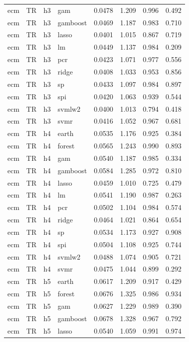 \begin{ThreePartTable}
\begin{longtable}[t]{llclcccc}
ecm & TR & h3 & gam & 0.0478 & 1.209 & 0.996 & 0.492\\
ecm & TR & h3 & gamboost & 0.0469 & 1.187 & 0.983 & 0.710\\
ecm & TR & h3 & lasso & 0.0401 & 1.015 & 0.867 & 0.719\\
ecm & TR & h3 & lm & 0.0449 & 1.137 & 0.984 & 0.209\\
ecm & TR & h3 & pcr & 0.0423 & 1.071 & 0.977 & 0.556\\
ecm & TR & h3 & ridge & 0.0408 & 1.033 & 0.953 & 0.856\\
ecm & TR & h3 & sp & 0.0433 & 1.097 & 0.984 & 0.897\\
ecm & TR & h3 & spi & 0.0420 & 1.063 & 0.939 & 0.544\\
ecm & TR & h3 & svmlw2 & 0.0400 & 1.013 & 0.794 & 0.418\\
ecm & TR & h3 & svmr & 0.0416 & 1.052 & 0.967 & 0.681\\
\addlinespace
ecm & TR & h4 & earth & 0.0535 & 1.176 & 0.925 & 0.384\\
ecm & TR & h4 & forest & 0.0565 & 1.243 & 0.990 & 0.893\\
ecm & TR & h4 & gam & 0.0540 & 1.187 & 0.985 & 0.334\\
ecm & TR & h4 & gamboost & 0.0584 & 1.285 & 0.972 & 0.810\\
ecm & TR & h4 & lasso & 0.0459 & 1.010 & 0.725 & 0.479\\
ecm & TR & h4 & lm & 0.0541 & 1.190 & 0.987 & 0.263\\
ecm & TR & h4 & pcr & 0.0502 & 1.104 & 0.984 & 0.574\\
ecm & TR & h4 & ridge & 0.0464 & 1.021 & 0.864 & 0.654\\
ecm & TR & h4 & sp & 0.0534 & 1.173 & 0.927 & 0.908\\
ecm & TR & h4 & spi & 0.0504 & 1.108 & 0.925 & 0.744\\
ecm & TR & h4 & svmlw2 & 0.0488 & 1.074 & 0.905 & 0.721\\
ecm & TR & h4 & svmr & 0.0475 & 1.044 & 0.899 & 0.292\\
\addlinespace
ecm & TR & h5 & earth & 0.0617 & 1.209 & 0.917 & 0.429\\
ecm & TR & h5 & forest & 0.0676 & 1.325 & 0.986 & 0.934\\
ecm & TR & h5 & gam & 0.0627 & 1.229 & 0.989 & 0.390\\
ecm & TR & h5 & gamboost & 0.0678 & 1.328 & 0.967 & 0.792\\
ecm & TR & h5 & lasso & 0.0540 & 1.059 & 0.991 & 0.974\\

\end{longtable}
\end{ThreePartTable}
